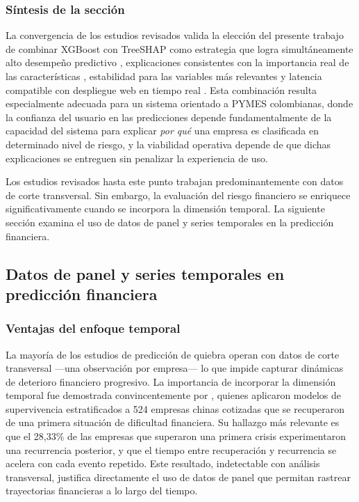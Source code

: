 \documentclass[12pt, letterpaper]{article}
\begin{document}
\subsubsection{S\'intesis de la secci\'on}

La convergencia de los estudios revisados valida la elecci\'on del presente trabajo de combinar XGBoost con TreeSHAP como estrategia que logra simult\'aneamente alto desempe\~no predictivo \citep{Dasilas2024, Bussmann2020}, explicaciones consistentes con la importancia real de las caracter\'isticas \citep{Pathi2025}, estabilidad para las variables m\'as relevantes \citep{Lin2024} y latencia compatible con despliegue web en tiempo real \citep{LundbergTreeSHAP2020, Deng2024}. Esta combinaci\'on resulta especialmente adecuada para un sistema orientado a PYMES colombianas, donde la confianza del usuario en las predicciones depende fundamentalmente de la capacidad del sistema para explicar \textit{por qu\'e} una empresa es clasificada en determinado nivel de riesgo, y la viabilidad operativa depende de que dichas explicaciones se entreguen sin penalizar la experiencia de uso.

Los estudios revisados hasta este punto trabajan predominantemente con datos de corte transversal. Sin embargo, la evaluaci\'on del riesgo financiero se enriquece significativamente cuando se incorpora la dimensi\'on temporal. La siguiente secci\'on examina el uso de datos de panel y series temporales en la predicci\'on financiera.

\subsection{Datos de panel y series temporales en predicci\'on financiera}
\label{sec:panel}

\subsubsection{Ventajas del enfoque temporal}

La mayor\'ia de los estudios de predicci\'on de quiebra operan con datos de corte transversal ---una observaci\'on por empresa--- lo que impide capturar din\'amicas de deterioro financiero progresivo. La importancia de incorporar la dimensi\'on temporal fue demostrada convincentemente por \citet{Zhou2022}, quienes aplicaron modelos de supervivencia estratificados a 524 empresas chinas cotizadas que se recuperaron de una primera situaci\'on de dificultad financiera. Su hallazgo m\'as relevante es que el 28,33\% de las empresas que superaron una primera crisis experimentaron una recurrencia posterior, y que el tiempo entre recuperaci\'on y recurrencia se acelera con cada evento repetido. Este resultado, indetectable con an\'alisis transversal, justifica directamente el uso de datos de panel que permitan rastrear trayectorias financieras a lo largo del tiempo.
\end{document}
